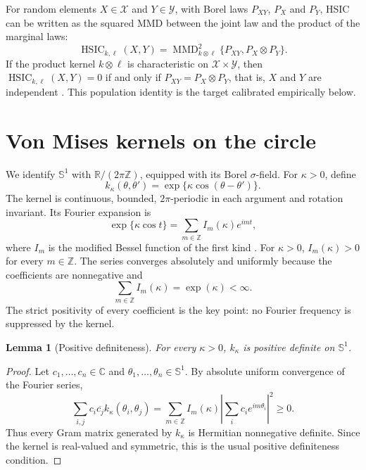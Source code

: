 \documentclass[11pt]{article}
\newtheorem{lemma}{Lemma}
\newcommand{\Sone}{\mathbb S^1}
\newcommand{\HSIC}{\operatorname{HSIC}}
\newcommand{\MMD}{\operatorname{MMD}}
\begin{document}
For random elements \(X\in\mathcal X\) and \(Y\in\mathcal Y\), with Borel laws \(P_{XY}\), \(P_X\) and \(P_Y\), HSIC can be written as the squared MMD between the joint law and the product of the marginal laws:
\[
  \HSIC_{k,\ell}(X,Y)
  =
  \MMD^2_{k\otimes \ell}\{P_{XY},P_X\otimes P_Y\}.
\]
If the product kernel \(k\otimes\ell\) is characteristic on \(\mathcal X\times\mathcal Y\), then \(\HSIC_{k,\ell}(X,Y)=0\) if and only if \(P_{XY}=P_X\otimes P_Y\), that is, \(X\) and \(Y\) are independent \citep{gretton2005hsic,gretton2008kernel}.  This population identity is the target calibrated empirically below.

\section{Von Mises kernels on the circle}

We identify \(\Sone\) with \(\mathbb R/(2\pi\mathbb Z)\), equipped with its Borel \(\sigma\)-field.  For \(\kappa>0\), define
\[
  k_\kappa(\theta,\theta')=\exp\{\kappa\cos(\theta-\theta')\}.
\]
The kernel is continuous, bounded, \(2\pi\)-periodic in each argument and rotation invariant.  Its Fourier expansion is
\[
  \exp\{\kappa\cos t\}
  =
  \sum_{m\in\mathbb Z} I_m(\kappa)e^{imt},
\]
where \(I_m\) is the modified Bessel function of the first kind \citep{abramowitz1964handbook}.  For \(\kappa>0\), \(I_m(\kappa)>0\) for every \(m\in\mathbb Z\).  The series converges absolutely and uniformly because the coefficients are nonnegative and
\[
  \sum_{m\in\mathbb Z} I_m(\kappa)=\exp(\kappa)<\infty .
\]
The strict positivity of every coefficient is the key point: no Fourier frequency is suppressed by the kernel.

\begin{lemma}[Positive definiteness]
For every \(\kappa>0\), \(k_\kappa\) is positive definite on \(\Sone\).
\end{lemma}

\begin{proof}
Let \(c_1,\ldots,c_n\in\mathbb C\) and \(\theta_1,\ldots,\theta_n\in\Sone\).  By absolute uniform convergence of the Fourier series,
\[
  \sum_{i,j} c_i\overline{c_j}k_\kappa(\theta_i,\theta_j)
  =
  \sum_{m\in\mathbb Z} I_m(\kappa)
  \left|\sum_i c_i e^{im\theta_i}\right|^2
  \ge 0.
\]
Thus every Gram matrix generated by \(k_\kappa\) is Hermitian nonnegative definite.  Since the kernel is real-valued and symmetric, this is the usual positive definiteness condition.
\end{proof}
\end{document}
